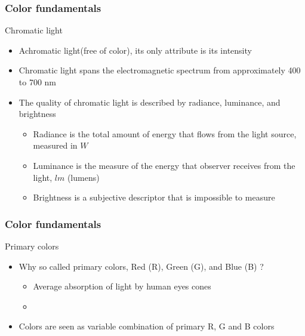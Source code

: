 \documentclass{beamer}
\begin{document}
\begin{frame}
\frametitle{Color fundamentals}
\begin{block}{Chromatic light}
\begin{itemize}
	\item Achromatic light(free of color), its only attribute is its intensity
	\item Chromatic light spans the electromagnetic spectrum from approximately 400 to 700 nm
	\item The quality of chromatic light is described by radiance, luminance, and brightness
	\begin{itemize}
		\item Radiance is the total amount of energy that flows from the light source, measured in $W$
		\item Luminance is the measure of the energy that observer receives from the light, $lm$ (lumens)
		\item Brightness is a subjective descriptor that is impossible to measure
	\end{itemize}
\end{itemize}
\end{block}
\end{frame}
\begin{frame}
\frametitle{Color fundamentals}
\begin{block}{Primary colors}
\begin{itemize}
	\item Why so called primary colors, Red (R), Green (G), and Blue (B) ? 
	\begin{itemize}
	\item Average absorption of light by human eyes cones
	\item[] 
	\end{itemize}
	\item Colors are seen as variable combination of primary R, G and B colors	
\end{itemize}
\end{block}
\end{frame}
\end{document}
